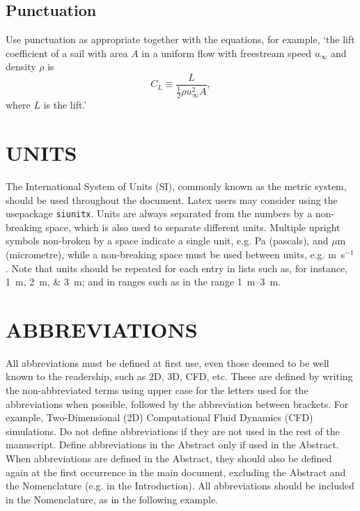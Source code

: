 \documentclass[oneside, a4paper, onecolumn, 11pt]{article}
\begin{document}
\subsection{Punctuation}

Use punctuation as appropriate together with the equations, for example, `the lift coefficient of a sail with area $A$ in a uniform flow with freestream speed $u_\infty$ and density $\rho$ is
\begin{equation}\label{eq:CL}
    C_L\equiv \frac{L}{\frac{1}{2}\rho u_\infty^2 A},
\end{equation}\noindent
where $L$ is the lift.'  

\section{UNITS}\label{sec:units}

The International System of Units (SI), commonly known as the metric system, should be used throughout the document. Latex users may consider using the usepackage {\tt siunitx}. Units are always separated from the numbers by a non-breaking space, which is also used to separate different units. Multiple upright symbols non-broken by a space indicate a single unit, e.g. Pa (pascals), and $\mu$m (micrometre), while a non-breaking space must be used between units, e.g. m~s$^{-1}$. Note that units should be repeated for each entry in lists such as, for instance, \SIlist{1;2;3}{m}; and in ranges such as in the range \SIrange{1}{3}{m}. 


\section{ABBREVIATIONS}\label{sec:abbreviations}

All abbreviations must be defined at first use, even those deemed to be well known to the readership, such as 2D, 3D, CFD, etc. These are defined by writing the non-abbreviated terms using upper case for the letters used for the abbreviations when possible, followed by the abbreviation between brackets. For example, Two-Dimensional (2D) Computational Fluid Dynamics (CFD) simulations. 
Do not define abbreviations if they are not used in the rest of the manuscript. Define abbreviations in the Abstract only if used in the Abstract. When abbreviations are defined in the Abstract, they should also be defined again at the first occurrence in the main document, excluding the Abstract and the Nomenclature (e.g. in the Introduction). All abbreviations should be included in the Nomenclature, as in the following example. 
\end{document}

